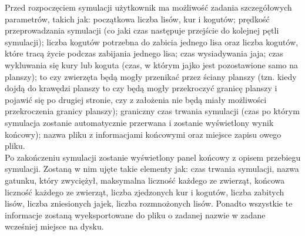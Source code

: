 \documentclass[10pt,a4paper]{article}
\begin{document}
			\indent
Przed rozpoczęciem symulacji użytkownik ma możliwość zadania szczegółowych parametrów, takich jak: początkowa liczba lisów, kur i kogutów; prędkość przeprowadzania symulacji (co jaki czas następuje przejście do kolejnej pętli symulacji); liczba kogutów potrzebna do zabicia jednego lisa oraz liczba kogutów, które tracą życie podczas zabijania jednego lisa; czas wysiadywania jaja; czas wykluwania się kury lub koguta (czas, w którym jajko jest pozostawione samo na planszy); to czy zwierzęta będą mogły przenikać przez ściany planszy (tzn. kiedy dojdą do krawędzi planszy to czy będą mogły przekroczyć granicę planszy i pojawić się po drugiej stronie, czy z założenia nie będą miały możliwości przekroczenia granicy planszy); graniczny czas trwania symulacji (czas po którym symulacja zostanie automatycznie przerwana i zostanie wyświetlony wynik końcowy); nazwa pliku z informacjami końcowymi oraz miejsce zapisu owego pliku. \\
			\indent
Po zakończeniu symulacji zostanie wyświetlony panel końcowy z opisem przebiegu symulacji. Zostaną w nim ujęte takie elementy jak: czas trwania symulacji, nazwa gatunku, który zwyciężył, maksymalna liczność każdego ze zwierząt, końcowa liczność każdego ze zwierząt, liczba zjedzonych kur i kogutów, liczba zabitych lisów, liczba zniesionych jajek, liczba rozmnożonych lisów. Ponadto wszystkie te informacje zostaną wyeksportowane do pliku o zadanej nazwie w zadane wcześniej miejsce na dysku.
\end{document}
